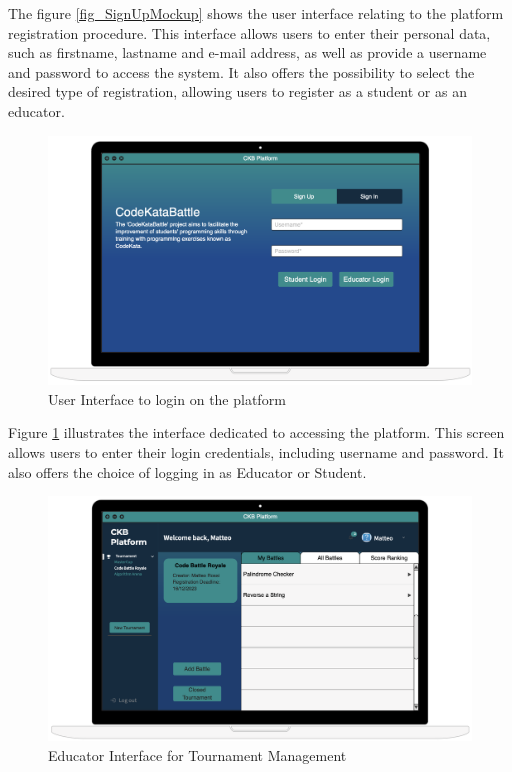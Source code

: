 The figure \ref{fig_SignUpMockup} shows the user interface relating to the platform registration procedure. This interface allows users to enter their personal data, such as firstname, lastname and e-mail address, as well as provide a username and password to access the system. 
It also offers the possibility to select the desired type of registration, allowing users to register as a student or as an educator.

\vspace{0.5\baselineskip}
\clearpage

\begin{figure}[h]
    \centering
    \includegraphics[scale=0.4]{images/Mockup/SignInMockup.png} 
    \caption{User Interface to login on the platform}
    \label{fig_SignInMockup}
\end{figure}

Figure \ref{fig_SignInMockup} illustrates the interface dedicated to accessing the platform. This screen allows users to enter their login credentials, including username and password. It also offers the choice of logging in as Educator or Student.

\vspace{0.5\baselineskip}
\begin{figure}[h]
    \centering
    \includegraphics[scale=0.35]{images/Mockup/TournamentManageMockup.png} 
    \caption{Educator Interface for Tournament Management}
    \label{fig_TournamentManageMockup}
\end{figure}

